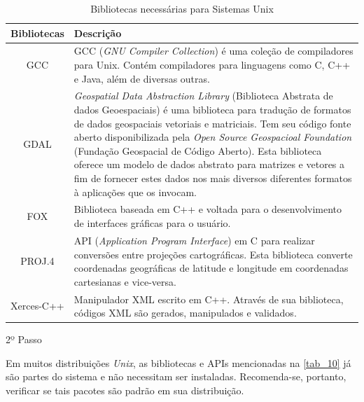 \documentclass[
12pt,				%
openright,			%
oneside,			%
a4paper,			%
brazil,				%
]{abntex2}
\begin{document}
{\begin{anexosenv}
                	\begin{table}[H]
			            \renewcommand{\arraystretch}{1.5}
			            \centering
			            \begin{tabular}{|c|p{13cm}|}
				            \hline
				            \textbf{Bibliotecas} & \textbf{Descrição} \\ \hline
                            GCC         & GCC (\textit{GNU Compiler Collection}) é uma coleção de compiladores para Unix. Contém compiladores para linguagens como C, C++ e Java, além de diversas outras. \\ \hline
                            GDAL        & \textit{Geospatial Data Abstraction Library} (Biblioteca Abstrata de dados Geoespaciais) é uma biblioteca para tradução de formatos de dados geospaciais vetoriais e matriciais. Tem seu código fonte aberto disponibilizada pela \textit{Open Source Geospacioal Foundation} (Fundação Geospacial de Código Aberto). Esta biblioteca oferece um modelo de dados abstrato para matrizes e vetores a fim de fornecer estes dados nos mais diversos diferentes formatos à aplicações que os invocam. \\ \hline
                            FOX         & Biblioteca baseada em C++ e voltada para o desenvolvimento de interfaces gráficas para o usuário. \\ \hline
                            PROJ.4      & API (\textit{Application Program Interface}) em C para realizar conversões entre projeções cartográficas. Esta biblioteca converte coordenadas geográficas de latitude e longitude em coordenadas cartesianas e vice-versa. \\ \hline
                            Xerces-C++  & Manipulador XML escrito em C++. Através de sua biblioteca, códigos XML são gerados, manipulados e validados. \\
				            \hline
			            \end{tabular}
			            \caption{Bibliotecas necessárias para Sistemas Unix}
                    	\label{tab_10}
                    \end{table}
                    

                	\begin{description}
		                \item[2º Passo]
		            \end{description}
		            \par Em muitos distribuições \textit{Unix}, as bibliotecas e APIs mencionadas na \autoref{tab_10} já são partes do sistema e não necessitam ser instaladas. Recomenda-se, portanto, verificar se tais pacotes são padrão em sua distribuição.
                    

\end{anexosenv}}
\end{document}

